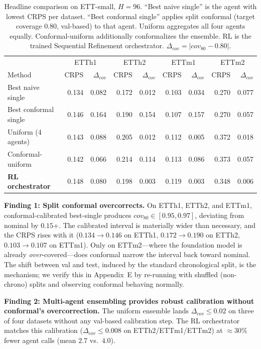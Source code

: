\documentclass{article}
\begin{document}
\begin{table}[h]
  \centering
  \small
  \caption{Headline comparison on ETT-small, $H=96$. ``Best naive single''
    is the agent with lowest CRPS per dataset. ``Best conformal single''
    applies split conformal (target coverage $0.80$, val-based) to that
    agent. Uniform aggregates all four agents equally. Conformal-uniform
    additionally conformalizes the ensemble. RL is the trained
    Sequential Refinement orchestrator. $\Delta_{\!cov} = |cov_{80} - 0.80|$.}
  \label{tab:headline}
  \begin{tabular}{lrrrrrrrr}
  \toprule
  & \multicolumn{2}{c}{ETTh1} & \multicolumn{2}{c}{ETTh2} & \multicolumn{2}{c}{ETTm1} & \multicolumn{2}{c}{ETTm2} \\
  Method & CRPS & $\Delta_{\!cov}$ & CRPS & $\Delta_{\!cov}$ & CRPS & $\Delta_{\!cov}$ & CRPS & $\Delta_{\!cov}$ \\
  \midrule
  Best naive single          & 0.134 & 0.082 & 0.172 & 0.012 & 0.103 & 0.034 & 0.270 & 0.077 \\
  Best conformal single      & 0.146 & 0.164 & 0.190 & 0.154 & 0.107 & 0.157 & 0.270 & 0.057 \\
  Uniform (4 agents)         & 0.143 & 0.088 & 0.205 & 0.012 & 0.112 & 0.005 & 0.372 & 0.018 \\
  Conformal-uniform          & 0.142 & 0.066 & 0.214 & 0.114 & 0.113 & 0.086 & 0.373 & 0.057 \\
  \textbf{RL orchestrator}   & 0.148 & 0.080 & 0.198 & 0.003 & 0.119 & 0.003 & 0.348 & 0.006 \\
  \bottomrule
  \end{tabular}
\end{table}

\textbf{Finding 1: Split conformal overcorrects.}
On ETTh1, ETTh2, and ETTm1, conformal-calibrated best-single produces
$cov_{80} \in [0.95, 0.97]$, deviating from nominal by $0.15$+. The
calibrated interval is materially wider than necessary, and the
CRPS rises with it ($0.134 \to 0.146$ on ETTh1, $0.172 \to 0.190$
on ETTh2, $0.103 \to 0.107$ on ETTm1). Only on ETTm2---where the
foundation model is already \emph{over}-covered---does conformal
narrow the interval back toward nominal. The shift between val and
test, induced by the standard chronological split, is the mechanism;
we verify this in Appendix~E by re-running with shuffled (non-chrono)
splits and observing conformal behaving normally.

\textbf{Finding 2: Multi-agent ensembling provides robust calibration
without conformal's overcorrection.}
The uniform ensemble lands $\Delta_{\!cov} \le 0.02$ on three of four
datasets without any val-based calibration step. The RL orchestrator
matches this calibration ($\Delta_{\!cov} \le 0.008$ on ETTh2/ETTm1/ETTm2)
at $\approx 30\%$ fewer agent calls (mean $2.7$ vs.\ $4.0$).
\end{document}
